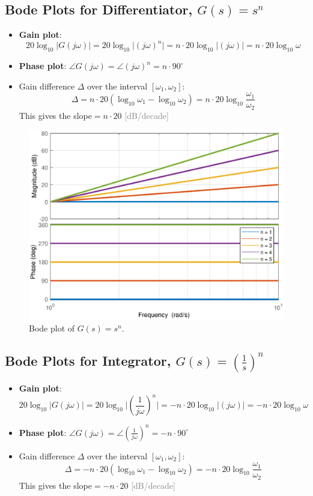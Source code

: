 \subsection{Bode Plots for Differentiator, $G(s) = s^{n}$}
\begin{itemize}
\item \textbf{Gain plot}: \[20\log_{10}\lvert G(j\omega) \rvert  = 20\log_{10}\lvert (j\omega)^{n} \rvert = n\cdot 20\log_{10}\lvert (j\omega) \rvert=\boxed{n\cdot20\log_{10}\omega}\]
\item \textbf{Phase plot}: $\angle G(j\omega) = \angle (j\omega)^{n} = \boxed{n\cdot 90^{\circ}}$
\item Gain difference $\Delta$ over the interval $[\omega_{1}, \omega_{2}] $: \[ \Delta = n\cdot20(\log_{10}\omega_{1}-\log_{10}\omega_{2})=\boxed{n\cdot20 \log_{10}\frac{\omega_{1}}{\omega_{2}}}\]
This gives the slope$=n\cdot 20$ \textcolor{gray}{[dB/decade]}
\end{itemize}

\begin{figure}[H] 
    \centering 
    \includegraphics[width=.7\textwidth]{images/bode6.eps}
    \caption{Bode plot of $G(s) = s^{n}$.}
\end{figure}

\subsection{Bode Plots for Integrator, $G(s) = (\frac{1}{s})^{n}$}
\begin{itemize}
\item \textbf{Gain plot}: \[20\log_{10}\lvert G(j\omega) \rvert  = 20\log_{10}\lvert (\frac{1}{j\omega})^{n} \rvert = -n\cdot 20\log_{10}\lvert (j\omega) \rvert=\boxed{-n\cdot20\log_{10}\omega}\]
\item \textbf{Phase plot}: $\angle G(j\omega) = \angle (\frac{1}{j\omega})^{n} = \boxed{-n\cdot 90^{\circ}}$
\item Gain difference $\Delta$ over the interval $[\omega_{1}, \omega_{2}] $: \[ \Delta = -n\cdot20(\log_{10}\omega_{1}-\log_{10}\omega_{2})=\boxed{-n\cdot20 \log_{10}\frac{\omega_{1}}{\omega_{2}}}\]
This gives the slope$=-n\cdot 20$ \textcolor{gray}{[dB/decade]}
\end{itemize}

